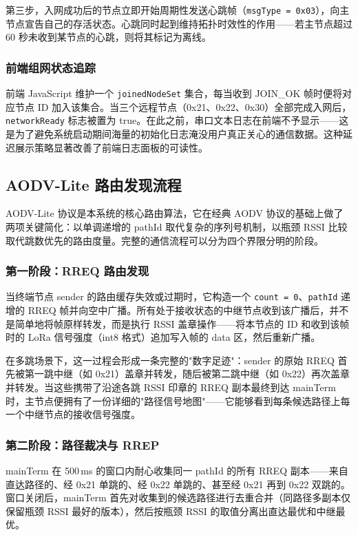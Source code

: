 \documentclass[12pt,a4paper]{ctexart}
\begin{document}
第三步，入网成功后的节点立即开始周期性发送心跳帧（\texttt{msgType = 0x03}），向主节点宣告自己的存活状态。心跳同时起到维持拓扑时效性的作用——若主节点超过 60 秒未收到某节点的心跳，则将其标记为离线。

\subsubsection{前端组网状态追踪}

前端 JavaScript 维护一个 \texttt{joinedNodeSet} 集合，每当收到 JOIN\_OK 帧时便将对应节点 ID 加入该集合。当三个远程节点（0x21、0x22、0x30）全部完成入网后，\texttt{networkReady} 标志被置为 true。在此之前，串口文本日志在前端不予显示——这是为了避免系统启动期间海量的初始化日志淹没用户真正关心的通信数据。这种延迟展示策略显著改善了前端日志面板的可读性。

\subsection{AODV-Lite 路由发现流程}

AODV-Lite 协议是本系统的核心路由算法，它在经典 AODV 协议的基础上做了两项关键简化：以单调递增的 pathId 取代复杂的序列号机制，以瓶颈 RSSI 比较取代跳数优先的路由度量。完整的通信流程可以分为四个界限分明的阶段。

\subsubsection{第一阶段：RREQ 路由发现}

当终端节点 sender 的路由缓存失效或过期时，它构造一个 \texttt{count = 0}、\texttt{pathId} 递增的 RREQ 帧并向空中广播。所有处于接收状态的中继节点收到该广播后，并不是简单地将帧原样转发，而是执行 RSSI 盖章操作——将本节点的 ID 和收到该帧时的 LoRa 信号强度（int8 格式）追加写入帧的 data 区，然后重新广播。

在多跳场景下，这一过程会形成一条完整的"数字足迹"：sender 的原始 RREQ 首先被第一跳中继（如 0x21）盖章并转发，随后被第二跳中继（如 0x22）再次盖章并转发。当这些携带了沿途各跳 RSSI 印章的 RREQ 副本最终到达 mainTerm 时，主节点便拥有了一份详细的"路径信号地图"——它能够看到每条候选路径上每一个中继节点的接收信号强度。

\subsubsection{第二阶段：路径裁决与 RREP}

mainTerm 在 500\,ms 的窗口内耐心收集同一 pathId 的所有 RREQ 副本——来自直达路径的、经 0x21 单跳的、经 0x22 单跳的、甚至经 0x21 再到 0x22 双跳的。窗口关闭后，mainTerm 首先对收集到的候选路径进行去重合并（同路径多副本仅保留瓶颈 RSSI 最好的版本），然后按瓶颈 RSSI 的取值分离出直达最优和中继最优。
\end{document}
